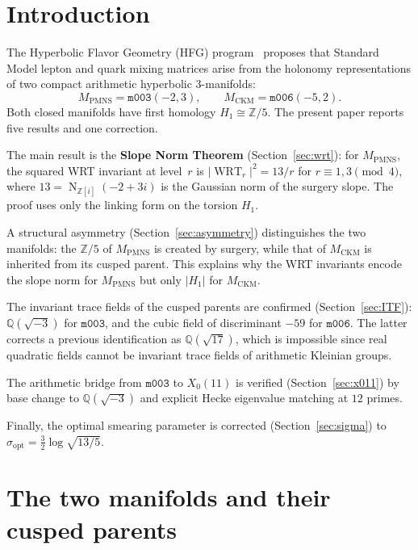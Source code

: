 \documentclass[11pt,a4paper]{article}
\theoremstyle{definition}
\newcommand{\Z}{\mathbb{Z}}
\newcommand{\Q}{\mathbb{Q}}
\newcommand{\mfld}[1]{\texttt{#1}}
\newcommand{\WRT}{\operatorname{WRT}}
\newcommand{\N}{\operatorname{N}}
\begin{document}
\section{Introduction}

The Hyperbolic Flavor Geometry (HFG) program~\cite{GentryUnified}
proposes that Standard Model lepton and quark mixing matrices arise
from the holonomy representations of two compact arithmetic hyperbolic
3-manifolds:
\[
M_{\mathrm{PMNS}} = \mfld{m003}(-2,3),\qquad
M_{\mathrm{CKM}} = \mfld{m006}(-5,2).
\]
Both closed manifolds have first homology $H_1\cong\Z/5$.
The present paper reports five results and one correction.

The main result is the \textbf{Slope Norm Theorem}
(Section~\ref{sec:wrt}): for $M_{\mathrm{PMNS}}$, the squared WRT
invariant at level~$r$ is $|\WRT_r|^2=13/r$ for $r\equiv1,3\pmod4$,
where $13=\N_{\Z[i]}(-2+3i)$ is the Gaussian norm of the surgery slope.
The proof uses only the linking form on the torsion $H_1$.

A structural asymmetry (Section~\ref{sec:asymmetry}) distinguishes
the two manifolds: the $\Z/5$ of $M_{\mathrm{PMNS}}$ is created by
surgery, while that of $M_{\mathrm{CKM}}$ is inherited from its cusped
parent. This explains why the WRT invariants encode the slope norm for
$M_{\mathrm{PMNS}}$ but only $|H_1|$ for $M_{\mathrm{CKM}}$.

The invariant trace fields of the cusped parents are confirmed
(Section~\ref{sec:ITF}): $\Q(\sqrt{-3})$ for $\mfld{m003}$,
and the cubic field of discriminant $-59$ for $\mfld{m006}$.
The latter corrects a previous identification as $\Q(\sqrt{17})$,
which is impossible since real quadratic fields cannot be invariant
trace fields of arithmetic Kleinian groups.

The arithmetic bridge from $\mfld{m003}$ to $X_0(11)$ is verified
(Section~\ref{sec:x011}) by base change to $\Q(\sqrt{-3})$ and
explicit Hecke eigenvalue matching at $12$ primes.

Finally, the optimal smearing parameter is corrected
(Section~\ref{sec:sigma}) to $\sigma_{\mathrm{opt}}=\tfrac32\log\sqrt{13/5}$.

\section{The two manifolds and their cusped parents}
\label{sec:basics}
\end{document}
